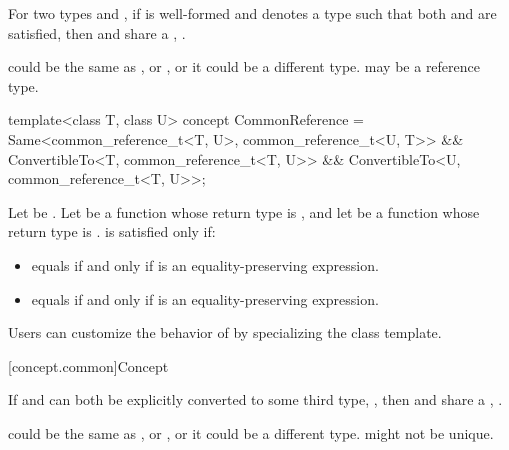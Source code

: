 \pnum
For two types  and , if 
is well-formed and denotes a type  such that both
and
are satisfied, then  and  share a
, .
\begin{note}
 could be the same as , or , or it could be a
different type.  may be a reference type.
\end{note}

%
\begin{itemdecl}
template<class T, class U>
  concept CommonReference =
    Same<common_reference_t<T, U>, common_reference_t<U, T>> &&
    ConvertibleTo<T, common_reference_t<T, U>> &&
    ConvertibleTo<U, common_reference_t<T, U>>;
\end{itemdecl}

\begin{itemdescr}
\pnum
Let  be . Let  be a
function whose return type is , and let  be a function
whose return type is .  is
satisfied only if:
\begin{itemize}
\item {} equals  if and only if  is an
  equality-preserving expression.
\item {} equals  if and only if  is an
  equality-preserving expression.
\end{itemize}

\pnum
\begin{note}
Users can customize the behavior of  by specializing
the  class template.
\end{note}
\end{itemdescr}

[concept.common]{Concept }

\pnum
If  and  can both be explicitly converted to some third type,
, then  and  share a ,
.
\begin{note}
 could be the same as , or , or it could be a
different type.  might not be unique.
\end{note}

